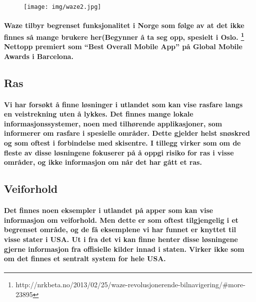 \begin{figure}[p]
\centering
\texttt{[image: img/waze2.jpg]}
\label{fig:waze2}
\end{figure}

\paragraph{Waze tilbyr begrenset funksjonalitet i Norge som følge av at det ikke finnes så mange brukere her(Begynner å ta seg opp, spesielt i Oslo. \footnote{http://nrkbeta.no/2013/02/25/waze-revolusjonerende-bilnavigering/#more-23895} Nettopp premiert som “Best Overall Mobile App” på Global Mobile Awards i Barcelona.}


\subsection{Ras}
\paragraph{Vi har forsøkt å finne løsninger i utlandet som kan vise rasfare langs en veistrekning uten å lykkes. Det finnes mange lokale informasjonssystemer, noen med tilhørende applikasjoner, som informerer om rasfare i spesielle områder. Dette gjelder helst snøskred og som oftest i forbindelse med skisentre. I tillegg virker som om de fleste av disse løsningene fokuserer på å oppgi risiko for ras i visse områder, og ikke informasjon om når det har gått et ras.}

\subsection{Veiforhold}
\paragraph{Det finnes noen eksempler i utlandet på apper som kan vise informasjon om veiforhold. Men dette er som oftest tilgjengelig i et begrenset område, og de få eksemplene vi har funnet er knyttet til visse stater i USA. Ut i fra det vi kan finne henter disse løsningene gjerne informasjon fra offisielle kilder innad i staten. Virker ikke som om det finnes et sentralt system for hele USA.}



